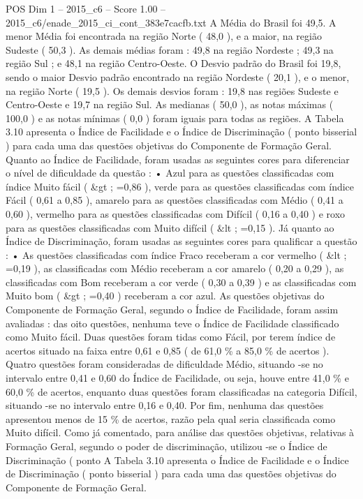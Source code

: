 \begin{textsample}{POS Dim 1 – 2015\_c6 – Score 1.00 – 2015\_c6/enade\_2015\_ci\_cont\_383e7cacfb.txt}
A Média do Brasil foi 49,5.
A menor Média foi encontrada na região Norte ( 48,0 ), e a maior, na região Sudeste ( 50,3 ).
As demais médias foram : 49,8 na região Nordeste ; 49,3 na região Sul ; e 48,1 na região Centro-Oeste.
O Desvio padrão do Brasil foi 19,8, sendo o maior Desvio padrão encontrado na região Nordeste ( 20,1 ), e o menor, na região Norte ( 19,5 ).
Os demais desvios foram : 19,8 nas regiões Sudeste e Centro-Oeste e 19,7 na região Sul.
As medianas ( 50,0 ), as notas máximas ( 100,0 ) e as notas mínimas ( 0,0 ) foram iguais para todas as regiões.
A Tabela 3.10 apresenta o Índice de Facilidade e o Índice de Discriminação ( ponto bisserial ) para cada uma das questões objetivas do Componente de Formação Geral.
Quanto ao Índice de Facilidade, foram usadas as seguintes cores para diferenciar o nível de dificuldade da questão : • Azul para as questões classificadas com índice Muito fácil ( \&gt ; =0,86 ), verde para as questões classificadas com índice Fácil ( 0,61 a 0,85 ), amarelo para as questões classificadas com Médio ( 0,41 a 0,60 ), vermelho para as questões classificadas com Difícil ( 0,16 a 0,40 ) e roxo para as questões classificadas com Muito difícil ( \&lt ; =0,15 ).
Já quanto ao Índice de Discriminação, foram usadas as seguintes cores para qualificar a questão : • As questões classificadas com índice Fraco receberam a cor vermelho ( \&lt ; =0,19 ), as classificadas com Médio receberam a cor amarelo ( 0,20 a 0,29 ), as classificadas com Bom receberam a cor verde ( 0,30 a 0,39 ) e as classificadas com Muito bom ( \&gt ; =0,40 ) receberam a cor azul.
As questões objetivas do Componente de Formação Geral, segundo o Índice de Facilidade, foram assim avaliadas : das oito questões, nenhuma teve o Índice de Facilidade classificado como Muito fácil.
Duas questões foram tidas como Fácil, por terem índice de acertos situado na faixa entre 0,61 e 0,85 ( de 61,0 \% a 85,0 \% de acertos ).
Quatro questões foram consideradas de dificuldade Médio, situando -se no intervalo entre 0,41 e 0,60 do Índice de Facilidade, ou seja, houve entre 41,0 \% e 60,0 \% de acertos, enquanto duas questões foram classificadas na categoria Difícil, situando -se no intervalo entre 0,16 e 0,40.
Por fim, nenhuma das questões apresentou menos de 15 \% de acertos, razão pela qual seria classificada como Muito difícil.
Como já comentado, para análise das questões objetivas, relativas à Formação Geral, segundo o poder de discriminação, utilizou -se o Índice de Discriminação ( ponto A Tabela 3.10 apresenta o Índice de Facilidade e o Índice de Discriminação ( ponto bisserial ) para cada uma das questões objetivas do Componente de Formação Geral.

\end{textsample}
